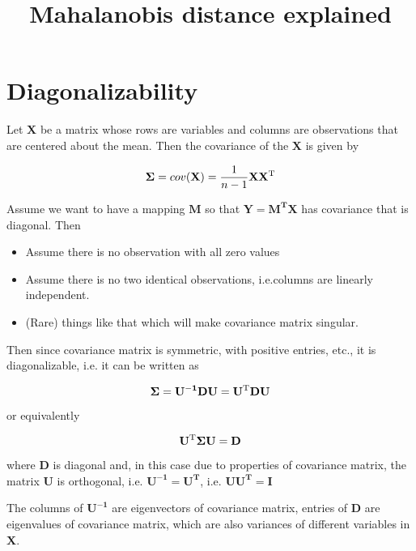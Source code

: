 \documentclass[12pt]{article}
\title{\textbf{Mahalanobis distance explained}}
\author{}
\date{}
\theoremstyle{plain}
\theoremstyle{definition}
\theoremstyle{definition}
\begin{document}
 

\maketitle

\section{Diagonalizability}

Let $\mathbf{X}$ be a matrix whose rows are variables and 
columns are observations that are centered about the mean. 
Then the covariance of the $\mathbf{X}$ is given by

\begin{equation}
\mathbf{{\Large{\Sigma} }}= cov(\mathbf{X}) = \frac{1}{n-1}\mathbf{ XX^\text{T}}
\end{equation}

Assume we want to have a mapping $\mathbf{M}$ so that $\mathbf{Y=M^\text{T}X}$ has covariance 
that is diagonal. Then

\begin{itemize}
\item Assume there is no observation with all zero values
\item Assume there is no two identical observations, i.e.columns are linearly independent.
\item (Rare) things like that which will make covariance matrix singular.
\end{itemize}

Then since covariance matrix is symmetric, with positive entries, etc., it is diagonalizable, 
i.e. it can be written as 

\begin{equation}\label{eq:eigendecomposition}
\mathbf{{\Large{\Sigma} }}  = \mathbf{U^{-1} D U = U^\text{T} D U}
\end{equation}

or equivalently 

\begin{equation}\label{eq:eigendecomposition2}
\mathbf{U^\text{T} {\Large{\Sigma} }U }  = \mathbf{D}
\end{equation}

where $\mathbf{D}$ is diagonal and, in this case due to properties of covariance matrix, the 
matrix $\mathbf{U}$ is orthogonal, i.e. $\mathbf{U^{-1} = U^\text{T}}$, i.e. $\mathbf{UU^\text{T}} = \mathbf{I}$

The columns of $\mathbf{U^{-1}}$ are eigenvectors of covariance matrix, entries of $\mathbf{D}$
are eigenvalues of covariance matrix, which are also variances of different variables in $\mathbf{X}$.
\end{document}
